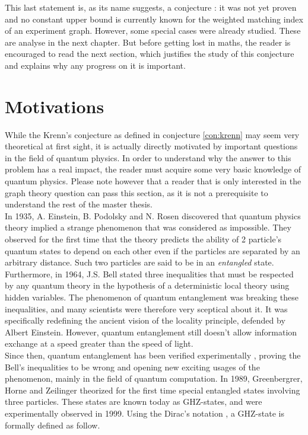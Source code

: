 This last statement is, as its name suggests, a conjecture : it was not yet proven and no constant upper bound is currently known for the weighted matching index of an experiment graph. However, some special cases were already studied. These are analyse in the next chapter. But before getting lost in maths, the reader is encouraged to read the next section, which justifies the study of this conjecture and explains why any progress on it is important.


\section{Motivations}
\label{sec:motivations}

While the Krenn's conjecture as defined in conjecture \ref{con:krenn} may seem very theoretical at first sight, it is actually directly motivated by important questions in the field of quantum physics. In order to understand why the answer to this problem has a real impact, the reader must acquire some very basic knowledge of quantum physics. Please note however that a reader that is only interested in the graph theory question can pass this section, as it is not a prerequisite to understand the rest of the master thesis. \\

In 1935, A. Einstein, B. Podolsky and N. Rosen discovered that quantum physics theory implied a strange phenomenon that was considered as impossible. They observed for the first time that the theory predicts the ability of 2 particle's quantum states to depend on each other even if the particles are separated by an arbitrary distance. \cite{EPR} Such two particles are said to be in an \textit{entangled} state. Furthermore, in 1964, J.S. Bell stated three inequalities that must be respected by any quantum theory in the hypothesis of a deterministic local theory using hidden variables. \cite{bell1964} The phenomenon of quantum entanglement was breaking these inequalities, and many scientists were therefore very sceptical about it. It was specifically redefining the ancient vision of the locality principle, defended by Albert Einstein. However, quantum entanglement still doesn't allow information exchange at a speed greater than the speed of light. \cite{notFasterThanLight}\\

Since then, quantum entanglement has been verified experimentally \cite{2012QuantumTA}, proving the Bell's inequalities to be wrong and opening new exciting usages of the phenomenon, mainly in the field of quantum computation. In 1989, Greenbergrer, Horne and Zeilinger theorized for the first time special entangled states involving three particles.\cite{GHZ} These states are known today as GHZ-states, and were experimentally observed in 1999.\cite{Bouwmeester_1999} Using the Dirac's notation \cite{dirac1939}, a GHZ-state is formally defined as follow. \\

